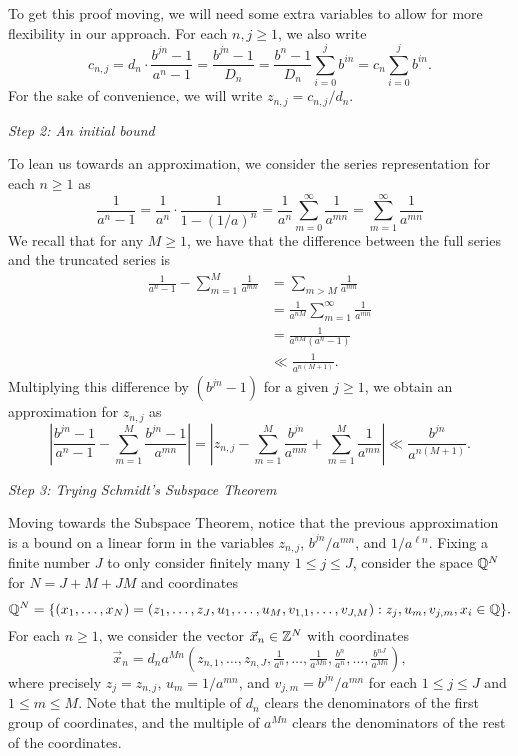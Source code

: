 To get this proof moving, 
we will need some extra variables to allow for more flexibility in our approach.
For each $n, j \geq 1$, we also write
\[
    c_{n,j} 
    = d_n \cdot \frac{b^{jn} - 1}{a^n - 1}
    = \frac{b^{jn} - 1}{D_n}
    = \frac{b^n - 1}{D_n} \sum_{i = 0}^j b^{in}
    = c_n \sum_{i = 0}^j b^{in}.
\]
For the sake of convenience, we will write $z_{n,j} = c_{n,j} / d_n$.

\noindent\textit{Step 2: An initial bound}

To lean us towards an approximation,
we consider the series representation for each $n \geq 1$ as
\[
    \frac{1}{a^n - 1}
    = \frac{1}{a^n} \cdot \frac{1}{1 - (1/a)^n}
    = \frac{1}{a^n} \sum_{m = 0}^\infty \frac{1}{a^{mn}}
    = \sum_{m = 1}^\infty \frac{1}{a^{mn}}
\]
We recall that for any $M \geq 1$,
we have that the difference between the full series and the truncated series is
\begin{align*}
    \frac{1}{a^n - 1} - \sum_{m = 1}^M \frac{1}{a^{mn}}
    & = \sum_{m > M} \frac{1}{a^{mn}} \\
    & = \frac{1}{a^{nM}} \sum_{m = 1}^\infty \frac{1}{a^{mn}} \\
    & = \frac{1}{a^{nM}(a^n - 1)} \\
    & \ll \frac{1}{a^{n(M + 1)}}.
\end{align*}
Multiplying this difference by $(b^{jn} - 1)$ for a given $j \geq 1$, 
we obtain an approximation for $z_{n,j}$ as
\[
    \left|
        \frac{b^{jn} - 1}{a^n - 1}
        - \sum_{m = 1}^M \frac{b^{jn} - 1}{a^{mn}}
    \right|
    = \left|
        z_{n,j}
        - \sum_{m = 1}^M \frac{b^{jn}}{a^{mn}}
        + \sum_{m = 1}^M \frac{1}{a^{m n}}
    \right|
    \ll \frac{b^{jn}}{a^{n(M + 1)}}.
\]

\noindent\textit{Step 3: Trying Schmidt's Subspace Theorem}

Moving towards the Subspace Theorem,
notice that the previous approximation is a bound on a linear form in the variables $z_{n,j}$, $b^{jn}/a^{mn}$, and $1/a^{\ell n}$.
Fixing a finite number $J$ to only consider finitely many $1 \leq j \leq J$,
consider the space $\mathbb{Q}^N$ for $N = J + M + JM$ and coordinates
\[
    \mathbb{Q}^N = \{
        (x_1, \ldots, x_N) = (
            z_1, \ldots, z_J, 
            u_1, \ldots, u_M,
            v_{1,1}, \ldots, v_{J,M}
        ) : 
        z_j, u_m, v_{j,m}, x_i \in \mathbb{Q}
    \}.
\]
For each $n \geq 1$, we consider the vector $\vec{x}_n \in \mathbb{Z}^N$ with coordinates
\[
    \vec{x}_n = d_n a^{Mn} (
        z_{n,1}, \ldots, z_{n,J},
        \tfrac{1}{a^n}, \ldots, \tfrac{1}{a^{Mn}},
        \tfrac{b^n}{a^n}, \ldots, \tfrac{b^{nJ}}{a^{Mn}}
    ),
\]
where precisely $z_j = z_{n,j}$, $u_m = 1/a^{mn}$, and $v_{j,m} = b^{jn}/a^{mn}$ for each $1 \leq j \leq J$ and $1 \leq m \leq M$.
Note that the multiple of $d_n$ clears the denominators of the first group of coordinates,
and the multiple of $a^{Mn}$ clears the denominators of the rest of the coordinates.

